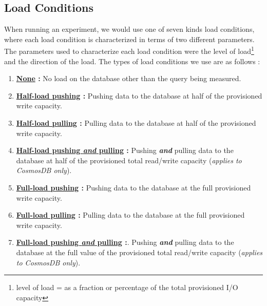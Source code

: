 \subsection{Load Conditions}

When running an experiment, we would use one of seven kinds load conditions, where each load condition is characterized in terms of two different parameters.  The parameters used to characterize each load condition were the level of load\footnote{level of load = as a fraction or percentage of the total provisioned I/O capacity} and the direction of the load.  The types of load conditions we use are as follows :

\vspace{0.1in}
\begin{spacing}{1.2}
\begin{enumerate}[label=\large{\textbf{\Alph*}):}]
	\item \textbf{\underline{None} :} No load on the database other than the query being measured.
	\vspace{0.05in}
	\item \textbf{\underline{Half-load pushing} :} Pushing data to the database at half of the provisioned write capacity.
	\vspace{0.05in}
	\item \textbf{\underline{Half-load pulling} :} Pulling data to the database at half of the provisioned write capacity.
	\vspace{0.05in}
	\item \textbf{\underline{Half-load pushing \emph{and} pulling} :} Pushing \emph{\textbf{and}} pulling data to the database at half of the provisioned total read/write capacity (\emph{applies to CosmosDB only}).
	\vspace{0.05in}
	\item \textbf{\underline{Full-load pushing} :} Pushing data to the database at the full provisioned write capacity.
	\vspace{0.05in}
	\item \textbf{\underline{Full-load pulling} :} Pulling data to the database at the full provisioned write capacity.
	\vspace{0.05in}
	\item \textbf{\underline{Full-load pushing \emph{and} pulling} :}. Pushing \emph{\textbf{and}} pulling data to the database at the full value of the provisioned total read/write capacity (\emph{applies to CosmosDB only}).
\end{enumerate}
\end{spacing}
